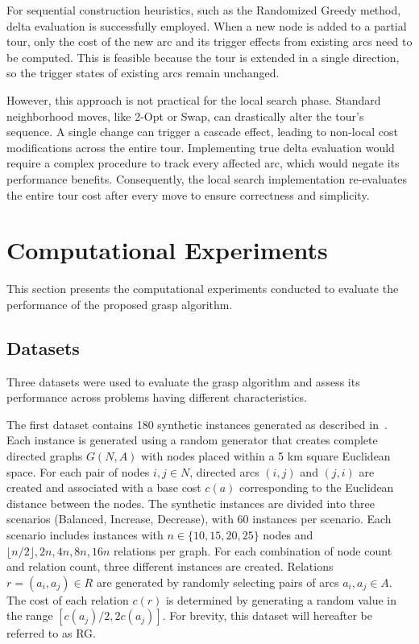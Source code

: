 \documentclass[twocolumn]{article} %
\begin{document}
For sequential construction heuristics, such as the Randomized Greedy method, delta evaluation is successfully employed. When a new node is added to a partial tour, only the cost of the new arc and its trigger effects from existing arcs need to be computed. This is feasible because the tour is extended in a single direction, so the trigger states of existing arcs remain unchanged.

However, this approach is not practical for the local search phase. Standard neighborhood moves, like 2-Opt or Swap, can drastically alter the tour's sequence. A single change can trigger a cascade effect, leading to non-local cost modifications across the entire tour. Implementing true delta evaluation would require a complex procedure to track every affected arc, which would negate its performance benefits. Consequently, the local search implementation re-evaluates the entire tour cost after every move to ensure correctness and simplicity.

\section{Computational Experiments}
This section presents the computational experiments conducted to evaluate the performance of the proposed \gls{grasp} algorithm.

\subsection{Datasets}

Three datasets were used to evaluate the \gls{grasp} algorithm and assess its performance across problems having different characteristics.

The first dataset contains 180 synthetic instances generated as described in~\citet{Cerrone}.
Each instance is generated using a random generator that creates complete directed graphs $G(N,A)$ 
with nodes placed within a 5 km square Euclidean space. 
For each pair of nodes $i, j \in N$, directed arcs $(i, j)$ and $(j, i)$ are created and associated with a base cost $c(a)$ 
corresponding to the Euclidean distance between the nodes. The synthetic instances are divided into three scenarios 
(Balanced, Increase, Decrease), with 60 instances per scenario. Each scenario includes instances with $n \in \{10, 15, 20, 25\}$ 
nodes and $\lfloor n/2 \rfloor, 2n, 4n, 8n, 16n$ relations per graph. For each combination of node count and relation count, three 
different instances are created.
Relations $r = (a_i, a_j) \in R$ are generated by randomly selecting pairs of arcs $a_i, a_j \in A$. The cost of each relation $c(r)$ 
is determined by generating a random value in the range $[c(a_j)/2, 2c(a_j)]$. For brevity, this dataset will hereafter be referred to as RG.
\end{document}
